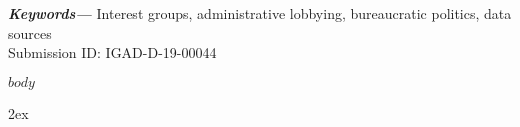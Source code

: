 \documentclass[12pt,notitlepage]{article}
\newcounter{def}
\providecommand{\keywords}[1]
{
	\small	
	\textbf{\textit{Keywords---}} #1
}
\begin{document}
	\keywords{Interest groups, administrative lobbying, bureaucratic politics, data sources} \\
	
	Submission ID: IGAD-D-19-00044
	\thispagestyle{empty}
	
	\newpage
	\clearpage
	
	\doublespacing
	
	$body$
	
	\newpage
	
	\theendnotes
		
	\begingroup
	\parindent 0pt
	\parskip 2ex
	\def\enotesize{\normalsize}
	\endgroup
	
	\newpage
		\singlespacing
	
	
\end{document}
